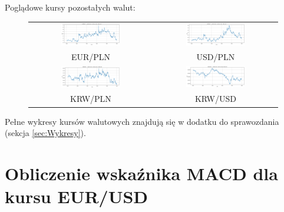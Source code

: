 \documentclass[12pt, a4paper]{article}
\begin{document}
\begin{center}
    Poglądowe kursy pozostałych walut:
\end{center}
\begin{figure}[ht]
    \hspace{-1cm}
    \begin{tabular}{cc}
        \includegraphics[width=0.5\textwidth]{eur_pln_value.png} &
        \includegraphics[width=0.5\textwidth]{usd_pln_value.png}           \\
        EUR/PLN                                                  & USD/PLN \\
        \includegraphics[width=0.5\textwidth]{krw_pln_value.png} &
        \includegraphics[width=0.5\textwidth]{krw_usd_value.png}           \\
        KRW/PLN                                                  & KRW/USD \\
    \end{tabular}
    \label{fig:other_currencies}
\end{figure}

Pełne wykresy kursów walutowych znajdują się w dodatku do sprawozdania (sekcja \ref{sec:Wykresy}).

\section{Obliczenie wskaźnika MACD dla kursu EUR/USD}
\end{document}
